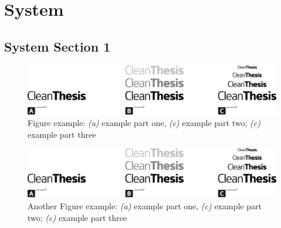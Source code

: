 %
\chapter{System}
\label{sec:system}


\section{System Section 1}
\label{sec:system:sec1}

\begin{figure}[htb]
    \includegraphics[width=\textwidth]{gfx/Clean-Thesis-Figure}
    \caption{Figure example: \textit{(a)} example part one, \textit{(c)} example part two; \textit{(c)} example part three}
    \label{fig:system:example1}
\end{figure}

\begin{figure}[htb]
    \includegraphics[width=\textwidth]{gfx/Clean-Thesis-Figure}
    \caption{Another Figure example: \textit{(a)} example part one, \textit{(c)} example part two; \textit{(c)} example part three}
    \label{fig:system:example2}
\end{figure}

